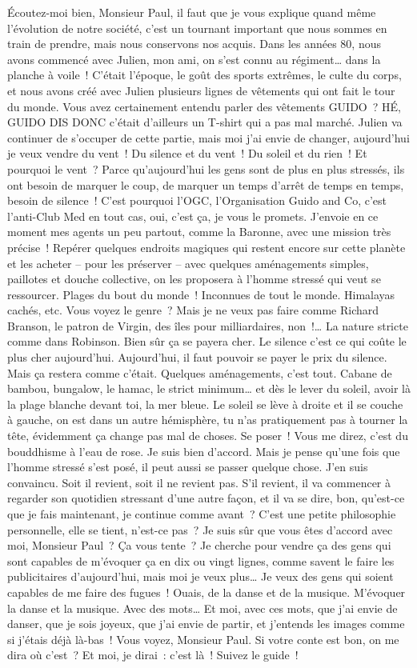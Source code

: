\documentclass[twoside]{book} %
\begin{document}
\noindent Écoutez-moi bien, Monsieur Paul, il faut que je vous explique quand même l’évolution de notre société, c’est un tournant important que nous sommes en train de prendre, mais nous conservons nos acquis. Dans les années 80, nous avons commencé avec Julien, mon ami, on s’est connu au régiment… dans la planche à voile ! C’était l’époque, le goût des sports extrêmes, le culte du corps, et nous avons créé avec Julien plusieurs lignes de vêtements qui ont fait le tour du monde. Vous avez certainement entendu parler des vêtements GUIDO ? HÉ, GUIDO DIS DONC c’était d’ailleurs un T-shirt qui a pas mal marché. Julien va continuer de s’occuper de cette partie, mais moi j’ai envie de changer, aujourd’hui je veux vendre du vent ! Du silence et du vent ! Du soleil et du rien ! Et pourquoi le vent ? Parce qu’aujourd’hui les gens sont de plus en plus stressés, ils ont besoin de marquer le coup, de marquer un temps d’arrêt de temps en temps, besoin de silence ! C’est pourquoi l’OGC, l’Organisation Guido and Co, c’est l’anti-Club Med en tout cas, oui, c’est ça, je vous le promets. J’envoie en ce moment mes agents un peu partout, comme la Baronne, avec une mission très précise ! Repérer quelques endroits magiques qui restent encore sur cette planète et les acheter – pour les préserver – avec quelques aménagements simples, paillotes et douche collective, on les proposera à l’homme stressé qui veut se ressourcer. Plages du bout du monde ! Inconnues de tout le monde. Himalayas cachés, etc. Vous voyez le genre ? Mais je ne veux pas faire comme Richard Branson, le patron de Virgin, des îles pour milliardaires, non !… La nature stricte comme dans Robinson. Bien sûr ça se payera cher. Le silence c’est ce qui coûte le plus cher aujourd’hui. Aujourd’hui, il faut pouvoir se payer le prix du silence. Mais ça restera comme c’était. Quelques aménagements, c’est tout. Cabane de bambou, bungalow, le hamac, le strict minimum… et dès le lever du soleil, avoir là la plage blanche devant toi, la mer bleue. Le soleil se lève à droite et il se couche à gauche, on est dans un autre hémisphère, tu n’as pratiquement pas à tourner la tête, évidemment ça change pas mal de choses. Se poser ! Vous me direz, c’est du bouddhisme à l’eau de rose. Je suis bien d’accord. Mais je pense qu’une fois que l’homme stressé s’est posé, il peut aussi se passer quelque chose. J’en suis convaincu. Soit il revient, soit il ne revient pas. S’il revient, il va commencer à regarder son quotidien stressant d’une autre façon, et il va se dire, bon, qu’est-ce que je fais maintenant, je continue comme avant ? C’est une petite philosophie personnelle, elle se tient, n’est-ce pas ? Je suis sûr que vous êtes d’accord avec moi, Monsieur Paul ? Ça vous tente ? Je cherche pour vendre ça des gens qui sont capables de m’évoquer ça en dix ou vingt lignes, comme savent le faire les publicitaires d’aujourd’hui, mais moi je veux plus… Je veux des gens qui soient capables de me faire des fugues ! Ouais, de la danse et de la musique. M’évoquer la danse et la musique. Avec des mots… Et moi, avec ces mots, que j’ai envie de danser, que je sois joyeux, que j’ai envie de partir, et j’entends les images comme si j’étais déjà là-bas ! Vous voyez, Monsieur Paul. Si votre conte est bon, on me dira où c’est ? Et moi, je dirai : c’est là ! Suivez le guide ! 
\end{document}
